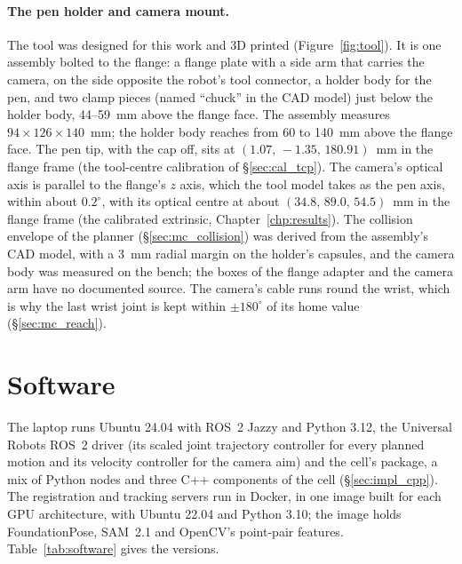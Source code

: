 \paragraph{The pen holder and camera mount.} The tool was designed for this work and 3D printed
(Figure~\ref{fig:tool}). It is one assembly bolted to the flange: a flange plate with a side arm
that carries the camera, on the side opposite the robot's tool connector, a holder body for the pen,
and two clamp pieces (named ``chuck'' in the CAD model) just below the holder body, 44--59~mm above
the flange face. The assembly measures $94\times126\times140$~mm; the holder
body reaches from 60 to 140~mm above the flange face. The pen tip, with the cap off, sits at
$(1.07,\,-1.35,\,180.91)$~mm in the flange frame (the tool-centre calibration of
\S\ref{sec:cal_tcp}). The camera's optical axis is parallel to the flange's $z$ axis, which the tool
model takes as the pen axis, within about $0.2^\circ$, with its optical centre at about $(34.8,\,89.0,\,54.5)$~mm in the flange frame (the calibrated
extrinsic, Chapter~\ref{chp:results}). The collision envelope of the planner
(\S\ref{sec:mc_collision}) was derived from the assembly's CAD model, with a 3~mm radial margin on the holder's capsules, and
the camera body was measured on the bench; the boxes of the flange adapter and the camera arm have no
documented source. The camera's cable runs round the wrist, which is why
the last wrist joint is kept within $\pm180^\circ$ of its home value (\S\ref{sec:mc_reach}).

\section{Software}
\label{sec:setup_software}
The laptop runs Ubuntu 24.04 with ROS~2 Jazzy and Python 3.12, the Universal Robots ROS~2 driver
(its scaled joint trajectory controller for every planned motion and its velocity controller for the
camera aim) and the cell's package, a mix of Python nodes and three C++ components of the cell
(\S\ref{sec:impl_cpp}). The registration and tracking servers run in Docker, in one image built for
each GPU architecture, with Ubuntu 22.04 and Python 3.10; the image holds FoundationPose, SAM~2.1 and
OpenCV's point-pair features. Table~\ref{tab:software} gives the versions.

